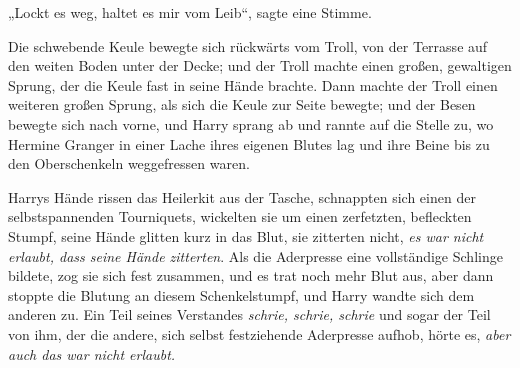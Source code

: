 „Lockt es weg, haltet es mir vom Leib“, sagte eine Stimme.

Die schwebende Keule bewegte sich rückwärts vom Troll, von der Terrasse auf den weiten Boden unter der Decke; und der Troll machte einen großen, gewaltigen Sprung, der die Keule fast in seine Hände brachte. Dann machte der Troll einen weiteren großen Sprung, als sich die Keule zur Seite bewegte; und der Besen bewegte sich nach vorne, und Harry sprang ab und rannte auf die Stelle zu, wo Hermine Granger in einer Lache ihres eigenen Blutes lag und ihre Beine bis zu den Oberschenkeln weggefressen waren.

Harrys Hände rissen das Heilerkit aus der Tasche, schnappten sich einen der selbstspannenden Tourniquets, wickelten sie um einen zerfetzten, befleckten Stumpf, seine Hände glitten kurz in das Blut, sie zitterten nicht, \emph{es war nicht erlaubt, dass seine Hände zitterten}. Als die Aderpresse eine vollständige Schlinge bildete, zog sie sich fest zusammen, und es trat noch mehr Blut aus, aber dann stoppte die Blutung an diesem Schenkelstumpf, und Harry wandte sich dem anderen zu. Ein Teil seines Verstandes \emph{schrie, schrie, schrie} und sogar der Teil von ihm, der die andere, sich selbst festziehende Aderpresse aufhob, hörte es, \emph{aber auch das war nicht erlaubt.}

